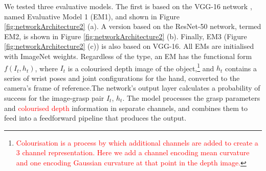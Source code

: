 We tested three evaluative models. The first is based on the VGG-16 network \cite{Simonyan14c}, named Evaluative Model 1 (EM1), and shown in Figure \ref{fig:networkArchitecture2} (a). A version based on the ResNet-50 network, termed EM2, is shown in Figure \ref{fig:networkArchitecture2} (b). Finally, EM3 (Figure \ref{fig:networkArchitecture2} (c)) is also based on VGG-16. All EMs are initialised with ImageNet weights. Regardless of the type, an EM has the functional form $f(I_t, h_t)$, where $I_t$ is a colourised depth image of the object,\footnote{\textcolor{red}{Colourisation is a process by which additional channels are added to create a 3 channel representation. Here we add a channel encoding mean curvature and one encoding Gaussian curvature at that point in the depth image.}} and $h_t$ contains a series of wrist poses and joint configurations for the hand, converted to the camera's frame of reference.The network's output layer calculates a probability of success for the image-grasp pair $I_t$, $h_t$. The model processes the grasp parameters and \textcolor{red}{colourised depth} information in separate channels, and combines them to feed into a feedforward pipeline that produces the output.
